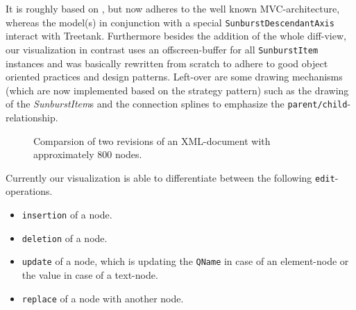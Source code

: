 \documentclass{llncs}
\begin{document}
It is roughly based on \cite{generative-gestaltung}, but now adheres to the well known MVC-architecture, whereas the model(s) in conjunction with a special \texttt{SunburstDescendantAxis} interact with Treetank. Furthermore besides the addition of the whole diff-view, our visualization in contrast uses an offscreen-buffer for all \texttt{SunburstItem} instances and was basically rewritten from scratch to adhere to good object oriented practices and design patterns. Left-over are some drawing mechanisms (which are now implemented based on the strategy pattern) such as the drawing of the \emph{SunburstItem}s and the connection splines to emphasize the \texttt{parent/child}-relationship.

\begin{figure}[htb]
\caption{\label{fig:treetank-gui} Comparsion of two revisions of an XML-document with approximately 800 nodes.}
\end{figure}

Currently our visualization is able to differentiate between the following \texttt{edit}-operations.

\begin{itemize}
\item \texttt{insertion} of a node.
\item \texttt{deletion} of a node.
\item \texttt{update} of a node, which is updating the \texttt{QName} in case of an element-node or the value in case of a text-node.
\item \texttt{replace} of a node with another node.
\end{itemize}
\end{document}
